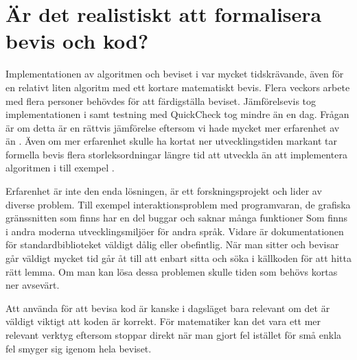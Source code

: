 \section{Är det realistiskt att formalisera bevis och kod?}
Implementationen av algoritmen och beviset i \coq{} var mycket tidskrävande,
även för en relativt liten algoritm med ett kortare matematiskt bevis. Flera
veckors arbete med flera personer behövdes för att färdigställa beviset.
Jämförelsevis tog implementationen i \haskell{} samt testning med QuickCheck tog
mindre än en dag. Frågan är om detta är en rättvis jämförelse eftersom vi hade
mycket mer erfarenhet av \haskell{} än \coq{}. Även om mer erfarenhet skulle ha
kortat ner utvecklingstiden markant tar formella bevis flera storleksordningar
längre tid att utveckla än att implementera algoritmen i till exempel \haskell{}.

Erfarenhet är inte den enda lösningen, \coq{} är ett forskningsprojekt och
lider av diverse problem. Till exempel interaktionsproblem med programvaran, de
grafiska gränssnitten som finns har en del buggar och saknar många funktioner
Som finns i andra moderna utvecklingsmiljöer för andra språk. Vidare är
dokumentationen för standardbiblioteket väldigt dålig eller obefintlig. När man
sitter och bevisar går väldigt mycket tid går åt till att enbart sitta och söka
i källkoden för att hitta rätt lemma. Om man kan lösa dessa problemen skulle
tiden som behövs kortas ner avsevärt.

Att använda \coq{} för att bevisa kod är kanske i dagsläget bara relevant om
det är väldigt viktigt att koden är korrekt. För matematiker kan det vara ett
mer relevant verktyg eftersom \coq{} stoppar direkt när man gjort fel istället
för små enkla fel smyger sig igenom hela beviset.
